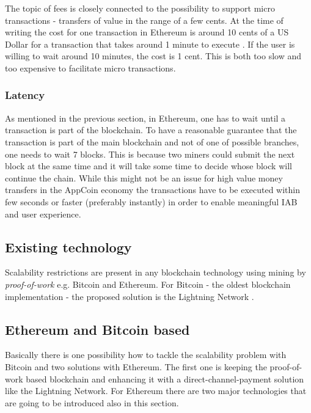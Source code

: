 The topic of fees is closely connected to the possibility to support micro transactions - transfers of value in the range of a few cents. At the time of writing the cost for one transaction in Ethereum is around 10 cents of a US Dollar for a transaction that takes around 1 minute to execute \cite{ethgasstation}. If the user is willing to wait around 10 minutes, the cost is 1 cent. This is both too slow and too expensive to facilitate micro transactions.

\subsubsection{Latency}
As mentioned in the previous section, in Ethereum, one has to wait until a transaction is part of the blockchain. To have a reasonable guarantee that the transaction is part of the main blockchain and not of one of possible branches, one needs to wait 7 blocks. This is because two miners could submit the next block at the same time and it will take some time to decide whose block will continue the chain. While this might not be an issue for high value money transfers in the AppCoin economy the transactions have to be executed within few seconds or faster (preferably instantly) in order to enable meaningful IAB and user experience.

\subsection{Existing technology}
Scalability restrictions are present in any blockchain technology using mining by \textit{proof-of-work} e.g. Bitcoin and Ethereum. For Bitcoin - the oldest blockchain implementation - the proposed solution is the Lightning Network \cite{LighthingNetwork}.


\subsection{Ethereum and Bitcoin based}

Basically there is one possibility how to tackle the scalability problem with Bitcoin and two solutions with Ethereum. The first one is keeping the proof-of-work based blockchain and enhancing it with a direct-channel-payment solution like the Lightning Network. For Ethereum there are two major technologies that are going to be introduced also in this section.

